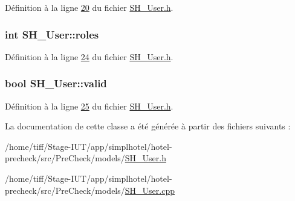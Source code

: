 Définition à la ligne \hyperlink{SH__User_8h_source_l00020}{20} du fichier \hyperlink{SH__User_8h_source}{S\-H\-\_\-\-User.\-h}.

\hypertarget{classSH__User_a4ccfdedef6ae4f0cf0345a7bfa306e9c}{
\subsubsection[{roles}]{\setlength{\rightskip}{0pt plus 5cm}int S\-H\-\_\-\-User\-::roles\hspace{0.3cm}{\ttfamily [read]}}}\label{classSH__User_a4ccfdedef6ae4f0cf0345a7bfa306e9c}


Définition à la ligne \hyperlink{SH__User_8h_source_l00024}{24} du fichier \hyperlink{SH__User_8h_source}{S\-H\-\_\-\-User.\-h}.

\hypertarget{classSH__User_a91cae1175894bf2eef629405638db01c}{
\subsubsection[{valid}]{\setlength{\rightskip}{0pt plus 5cm}bool S\-H\-\_\-\-User\-::valid\hspace{0.3cm}{\ttfamily [read]}}}\label{classSH__User_a91cae1175894bf2eef629405638db01c}


Définition à la ligne \hyperlink{SH__User_8h_source_l00025}{25} du fichier \hyperlink{SH__User_8h_source}{S\-H\-\_\-\-User.\-h}.



La documentation de cette classe a été générée à partir des fichiers suivants \-:\begin{DoxyCompactItemize}
\item 
/home/tiff/\-Stage-\/\-I\-U\-T/app/simplhotel/hotel-\/precheck/src/\-Pre\-Check/models/\hyperlink{SH__User_8h}{S\-H\-\_\-\-User.\-h}\item 
/home/tiff/\-Stage-\/\-I\-U\-T/app/simplhotel/hotel-\/precheck/src/\-Pre\-Check/models/\hyperlink{SH__User_8cpp}{S\-H\-\_\-\-User.\-cpp}\end{DoxyCompactItemize}
